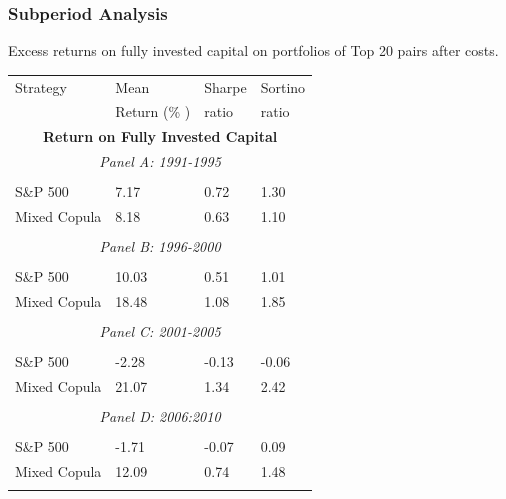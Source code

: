 \documentclass[pdf,9pt,xcolor=dvipsnames,hide notes]{beamer}
\begin{document}
\begin{frame}

\frametitle{Subperiod Analysis}

\begin{threeparttable}[H]
\centering \tiny
\caption{Excess returns on fully invested capital on portfolios of Top 20 pairs after costs. }
\begin{tabularx}{\textwidth}{@{\extracolsep{\fill}}llll@{}}
	\toprule
	Strategy & Mean  & Sharpe & Sortino \\
	& Return (\% ) & ratio &  ratio     \\
	\midrule
	\multicolumn{4}{c}{\textbf{Return on Fully Invested Capital}} \\
	\multicolumn{4}{c}{\textit{Panel A: 1991-1995}} \\
	&       &       &       \\
	S\&P 500 & 7.17  & 0.72  & 1.30 \\
	Mixed Copula & 8.18  & 0.63  & 1.10 \\
	\multicolumn{1}{r}{} & \multicolumn{1}{r}{} & \multicolumn{1}{r}{} & \multicolumn{1}{r}{} \\
	\multicolumn{4}{c}{\textit{Panel B: 1996-2000}} \\
	&       &       &       \\
	S\&P 500 & 10.03  & 0.51  & 1.01 \\
	Mixed Copula & 18.48  & 1.08  & 1.85 \\
	\multicolumn{1}{r}{} & \multicolumn{1}{r}{} & \multicolumn{1}{r}{} & \multicolumn{1}{r}{} \\
	\multicolumn{4}{c}{\textit{Panel C: 2001-2005}} \\
	&       &       &       \\
	S\&P 500 & -2.28  & \cellcolor{Melon} -0.13  & -0.06 \\
	Mixed Copula & 21.07  & \cellcolor{corn} 1.34  & 2.42 \\
	\multicolumn{1}{r}{} & \multicolumn{1}{r}{} & \multicolumn{1}{r}{} & \multicolumn{1}{r}{} \\
	\multicolumn{4}{c}{\textit{Panel D: 2006:2010}} \\
	&       &       &       \\
	S\&P 500 & -1.71  & \cellcolor{Melon} -0.07  & 0.09 \\
	Mixed Copula & 12.09  & \cellcolor{corn} 0.74  & 1.48 \\
	\multicolumn{1}{r}{} & \multicolumn{1}{r}{} & \multicolumn{1}{r}{} & \multicolumn{1}{r}{} \\

\end{tabularx}
\end{threeparttable}
\end{frame}
\end{document}
